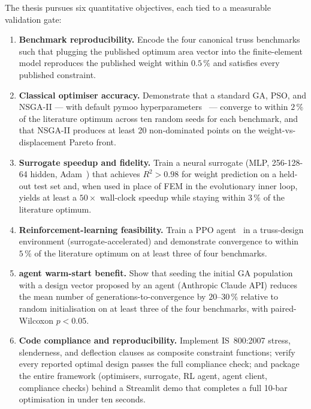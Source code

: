 The thesis pursues six quantitative objectives, each tied to a
measurable validation gate:
\begin{enumerate}
  \item \textbf{Benchmark reproducibility.} Encode the four
        canonical truss benchmarks such that plugging the published
        optimum area vector into the finite-element model reproduces
        the published weight within $\num{0.5}\,\%$ and satisfies
        every published constraint.
  \item \textbf{Classical optimiser accuracy.} Demonstrate that a
        standard GA, PSO, and NSGA-II — with default pymoo
        hyperparameters~\cite{blank2020pymoo} — converge to within
        $\num{2}\,\%$ of the literature optimum across ten random
        seeds for each benchmark, and that NSGA-II produces at
        least 20 non-dominated points on the weight-vs-displacement
        Pareto front.
  \item \textbf{Surrogate speedup and fidelity.} Train a neural
        surrogate (MLP, \mbox{\num{256}-\num{128}-\num{64}} hidden,
        Adam~\cite{kingma2015adam}) that achieves
        $R^{2} > \num{0.98}$ for weight prediction on a
        held-out test set and, when used in place of FEM in the
        evolutionary inner loop, yields at least a $50\times$
        wall-clock speedup while staying within $\num{3}\,\%$ of
        the literature optimum.
  \item \textbf{Reinforcement-learning feasibility.} Train a PPO
        agent~\cite{schulman2017ppo} in a truss-design environment
        (surrogate-accelerated) and demonstrate convergence to
        within $\num{5}\,\%$ of the literature optimum on at
        least three of four benchmarks.
  \item \textbf{agent warm-start benefit.} Show that seeding the
        initial GA population with a design vector proposed by an
        agent (Anthropic Claude API) reduces the mean number of
        generations-to-convergence by $\num{20}$--$\num{30}\,\%$
        relative to random initialisation on at least three of the
        four benchmarks, with paired-Wilcoxon $p < 0.05$.
  \item \textbf{Code compliance and reproducibility.} Implement
        IS~800:2007 stress, slenderness, and deflection clauses as
        composite constraint functions; verify every reported
        optimal design passes the full compliance check; and
        package the entire framework (optimisers, surrogate,
        RL agent, agent client, compliance checks) behind a Streamlit
        demo that completes a full 10-bar optimisation in under
        ten seconds.
\end{enumerate}

